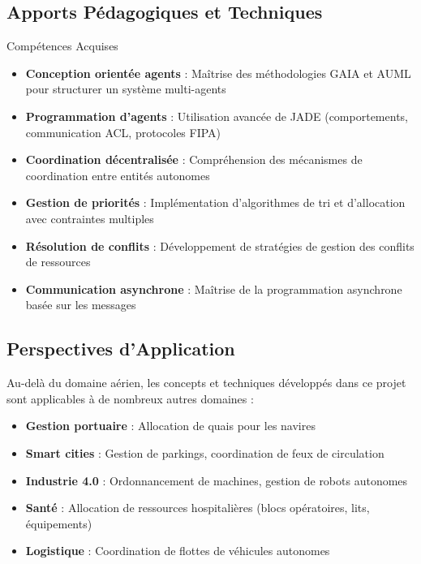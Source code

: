 \documentclass[12pt,a4paper]{article}
\begin{document}
\subsection{Apports Pédagogiques et Techniques}

\begin{infobox}{Compétences Acquises}
\begin{itemize}[leftmargin=*]
    \item \textbf{Conception orientée agents} : Maîtrise des méthodologies GAIA et AUML pour structurer un système multi-agents

    \item \textbf{Programmation d'agents} : Utilisation avancée de JADE (comportements, communication ACL, protocoles FIPA)

    \item \textbf{Coordination décentralisée} : Compréhension des mécanismes de coordination entre entités autonomes

    \item \textbf{Gestion de priorités} : Implémentation d'algorithmes de tri et d'allocation avec contraintes multiples

    \item \textbf{Résolution de conflits} : Développement de stratégies de gestion des conflits de ressources

    \item \textbf{Communication asynchrone} : Maîtrise de la programmation asynchrone basée sur les messages
\end{itemize}
\end{infobox}

\subsection{Perspectives d'Application}

Au-delà du domaine aérien, les concepts et techniques développés dans ce projet sont applicables à de nombreux autres domaines :

\begin{itemize}[leftmargin=*]
    \item[\color{primaryblue}$\blacksquare$] \textbf{Gestion portuaire} : Allocation de quais pour les navires
    \item[\color{primaryblue}$\blacksquare$] \textbf{Smart cities} : Gestion de parkings, coordination de feux de circulation
    \item[\color{primaryblue}$\blacksquare$] \textbf{Industrie 4.0} : Ordonnancement de machines, gestion de robots autonomes
    \item[\color{primaryblue}$\blacksquare$] \textbf{Santé} : Allocation de ressources hospitalières (blocs opératoires, lits, équipements)
    \item[\color{primaryblue}$\blacksquare$] \textbf{Logistique} : Coordination de flottes de véhicules autonomes
\end{itemize}
\end{document}
